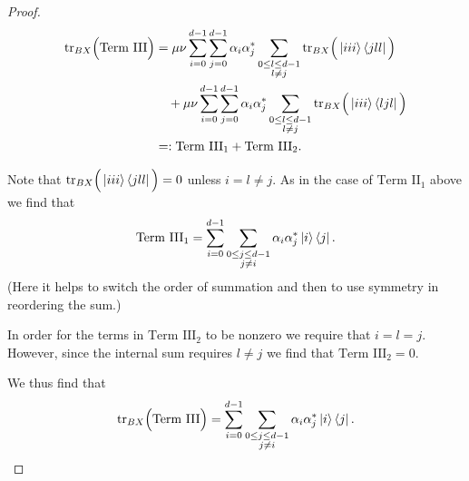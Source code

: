 \documentclass[reqno]{amsart}
\numberwithin{lemma}{section}
\numberwithin{proposition}{section}
\newcommand{\tr}{\textnormal{tr}}
\begin{document}
{\begin{proof}
\smallskip

\begin{align*}
\tr_{BX} \Big ( \text{Term III} \Big ) & = 
\mu \nu \sum_{i=0}^{d-1} \sum_{j=0}^{d-1} \alpha_{i} \alpha_{j}^{*} \sum_{\substack{0 \leq l \leq d-1\\ l \neq j}} \tr_{BX} \Big ( \ket{iii}\bra{jll} \Big )\\
& \quad + \mu \nu \sum_{i=0}^{d-1} \sum_{j=0}^{d-1} \alpha_{i} \alpha_{j}^{*} \sum_{\substack{0 \leq l \leq d-1\\ l \neq j}} \tr_{BX} \Big ( \ket{iii}\bra{ljl} \Big )\\
&=: \text{Term III}_{1} + \text{Term III}_{2}.
\end{align*}

Note that $\tr_{BX} \Big ( \ket{iii}\bra{jll} \Big ) = 0$ unless $i = l \neq j$. As in the case of $\text{Term II}_{1}$ above we find that
\begin{equation*}
\text{Term III}_{1} = \sum_{i=0}^{d-1} \sum_{\substack{0 \leq j \leq d-1\\ j \neq i}} \alpha_{i} \alpha_{j}^{*} \ket{i}\bra{j}.
\end{equation*}
(Here it helps to switch the order of summation and then to use symmetry in reordering the sum.)

In order for the terms in $\text{Term III}_{2}$ to be nonzero we require that $i = l = j$. However, since the internal sum requires $l \neq j$ we find that $\text{Term III}_{2} = 0.$ 

We thus find that
\begin{equation*}
\tr_{BX} \Big ( \text{Term III} \Big ) = \sum_{i=0}^{d-1} \sum_{\substack{0 \leq j \leq d-1\\ j \neq i}} \alpha_{i} \alpha_{j}^{*} \ket{i}\bra{j}.
\end{equation*}

\smallskip


\end{proof}}
\end{document}
